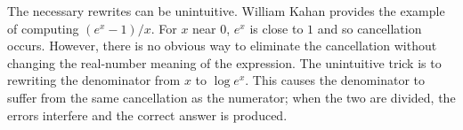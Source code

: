 \documentclass[paper.tex]{subfiles}
\begin{document}
The necessary rewrites can be unintuitive.
William Kahan provides the example~\cite{}
  of computing $(e^x - 1) / x$.
For $x$ near $0$, $e^x$ is close to $1$ and so cancellation occurs.
However, there is no obvious way to eliminate the cancellation
  without changing the real-number meaning of the expression.
The unintuitive trick is to rewriting the denominator
  from $x$ to $\log e^x$.
This causes the denominator to suffer
  from the same cancellation as the numerator;
  when the two are divided,
  the errors interfere and the correct answer is produced.
\end{document}

